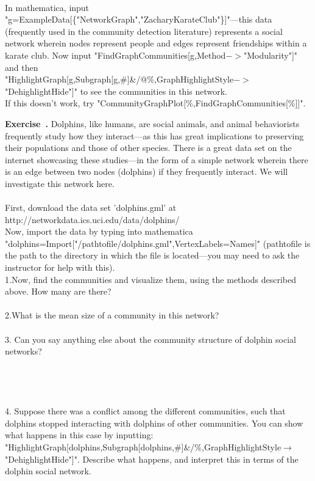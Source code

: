 \documentclass[12pt]{article}
\newcounter{exercise}[section]
\newenvironment{exercise}[1][]{\refstepcounter{exercise}\par\medskip
	\noindent \textbf{Exercise~\thesection.\theexercise #1} \rmfamily}{\medskip}
\begin{document}
\\In mathematica, input "g=ExampleData[\{"NetworkGraph","ZacharyKarateClub"\}]"---this data (frequently used in the community detection literature) represents a social network wherein nodes represent people and edges represent friendships within a karate club. Now input "FindGraphCommunities[g,Method$->$"Modularity"]" and then \\"HighlightGraph[g,Subgraph[g,\#]\&/@\%,GraphHighlightStyle$->$"DehighlightHide"]" to see the communities in this network.\\ If this doesn't work, try "CommunityGraphPlot[\%,FindGraphCommunities[\%]]".\\
\begin{exercise}
Dolphins, like humans, are social animals, and animal behaviorists frequently study how they interact---as this has great implications to preserving their populations and those of other species. There is a great data set on the internet showcasing these studies---in the form of a simple network wherein there is an edge between two nodes (dolphins) if they frequently interact. We will investigate this network here.\\
\\First, download the data set 'dolphins.gml' at http://networkdata.ics.uci.edu/data/dolphins/
\\Now, import the data by typing into mathematica "dolphins=Import["/pathtofile/dolphins.gml",VertexLabels=Names]" (pathtofile is the path to the directory in which the file is located---you may need to ask the instructor for help with this).
\\1.Now, find the communities and visualize them, using the methods described above. How many are there?\\
\\2.What is the mean size of a community in this network?
\\
\\
3. Can you say anything else about the community structure of dolphin social networks?
\\
\\
\\
\\
\\4. Suppose there was a conflict among the different communities, such that dolphins stopped interacting with dolphins of other communities. You can show what happens in this case by inputting: \\"HighlightGraph[dolphins,Subgraph[dolphins,\#]\&/\@\%,GraphHighlightStyle$\rightarrow$"DehighlightHide"]". Describe what happens, and interpret this in terms of the dolphin social network.\\

\end{exercise}
\end{document}
